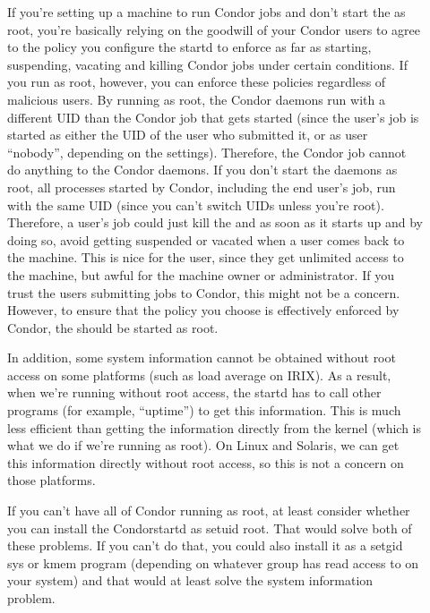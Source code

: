 \begin{description}

\item[] If you're setting up a machine to run Condor
   jobs and don't start the  as root, you're basically
   relying on the goodwill of your Condor users to agree to the policy
   you configure the startd to enforce as far as starting, suspending,
   vacating and killing Condor jobs under certain conditions.  If you
   run as root, however, you can enforce these policies regardless of
   malicious users.  By running as root, the Condor daemons run with a
   different UID than the Condor job that gets started (since the
   user's job is started as either the UID of the user who submitted
   it, or as user ``nobody'', depending on the 
   settings).  Therefore, the Condor job cannot do anything to the
   Condor daemons.  If you don't start the daemons as root, all
   processes started by Condor, including the end user's job, run with
   the same UID (since you can't switch UIDs unless you're root).
   Therefore, a user's job could just kill the  and
    as soon as it starts up and by doing so, avoid
   getting suspended or vacated when a user comes back to the machine.
   This is nice for the user, since they get unlimited access to the
   machine, but awful for the machine owner or administrator.  If you
   trust the users submitting jobs to Condor, this might not be a
   concern.  However, to ensure that the policy you choose is
   effectively enforced by Condor, the  should be
   started as root.

   In addition, some system information cannot be obtained without
   root access on some platforms (such as load average on IRIX).  As a
   result, when we're running without root access, the startd has to
   call other programs (for example, ``uptime'') to get this
   information.  This is much less efficient than getting the
   information directly from the kernel (which is what we do if we're
   running as root).  On Linux and Solaris, we can get this
   information directly without root access, so this is not a concern
   on those platforms.

   If you can't have all of Condor running as root, at least consider
   whether you can install the Condor{startd} as setuid root.  That
   would solve both of these problems.  If you can't do that, you
   could also install it as a setgid sys or kmem program (depending on
   whatever group has read access to  on your system)
   and that would at least solve the system information problem.


\end{description}
